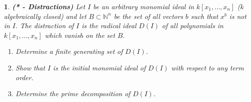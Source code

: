 \documentclass[11pt]{article}
\theoremstyle{problem}
\newtheorem{p}{}
\begin{document}
\begin{p}{\bf (* - Distractions)}
Let $I$ be an arbitrary monomial ideal in $k[x_1,\ldots,x_n]$ ($k$ algebraically closed) and let
$B \subset \mathbb{N}^n$ be the set of all vectors $b$ such that $x^b$ is not in $I$. The distraction of $I$ is
the radical ideal $D(I)$ of all polynomials in $k[x_1,\ldots,x_n]$ which vanish on the set $B$.
\begin{enumerate}
\item Determine a finite generating set of $D(I)$.
\item Show that $I$ is the initial monomial ideal of $D(I)$ with respect to any term order.
\item Determine the prime decomposition of $D(I)$.
\end{enumerate}
\end{p}


 
\end{document}
